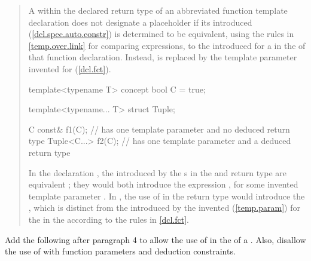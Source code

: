 \begin{quote}
\begin{addedblock}
\pnum
A   within the declared 
return type of an abbreviated function template declaration does not 
designate a placeholder if its introduced
 (\ref{dcl.spec.auto.constr}) 
is determined to be equivalent, using the rules in \ref{temp.over.link}
for comparing expressions, to the introduced 
 for a
  in the 
 of that function declaration.
% 
Instead,  is replaced by the template parameter invented for
 (\ref{dcl.fct}).
\enterexample
\begin{codeblock}
template<typename T> concept bool C = true;

template<typename... T> struct Tuple;

C const& f1(C);      // has one template parameter and no deduced return type
Tuple<C...> f2(C);   // has one template parameter and a deduced return type
\end{codeblock}
In the declaration , the  
introduced by the s in the
 and return type are equivalent
; they would both introduce the expression , for some invented 
template parameter .
% 
In , the use of  in the return type would introduce the
 , which is 
distinct from the   introduced
by the invented  (\ref{temp.param}) for 
the  in the 
 according to the rules in 
\ref{dcl.fct}.
\exitexample
\end{addedblock}
\end{quote}


Add the following after paragraph 4 to allow the use of  in the
 of a .
Also, disallow the use of  with function parameters
and deduction constraints.

